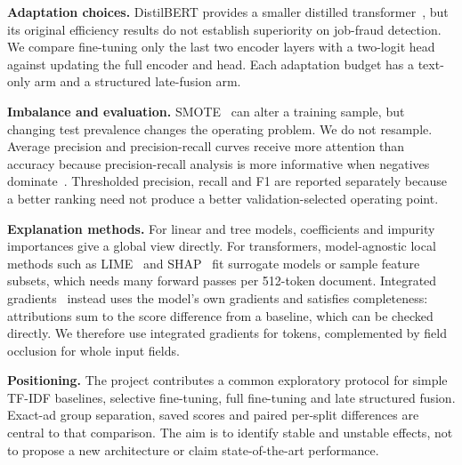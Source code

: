 \textbf{Adaptation choices.} DistilBERT provides a smaller distilled transformer~\cite{sanh2019},
but its original efficiency results do not establish superiority on job-fraud detection. We compare
fine-tuning only the last two encoder layers with a two-logit head against updating the full encoder
and head. Each adaptation budget has a text-only arm and a structured late-fusion arm.

\textbf{Imbalance and evaluation.} SMOTE~\cite{chawla2002} can alter a training sample, but changing
test prevalence changes the operating problem. We do not resample. Average precision and
precision-recall curves receive more attention than accuracy because precision-recall analysis is
more informative when negatives dominate~\cite{saito2015}. Thresholded precision, recall and F1 are
reported separately because a better ranking need not produce a better validation-selected
operating point.

\textbf{Explanation methods.} For linear and tree models, coefficients and impurity importances
give a global view directly. For transformers, model-agnostic local methods such as
LIME~\cite{ribeiro2016} and SHAP~\cite{lundberg2017} fit surrogate models or sample feature subsets,
which needs many forward passes per 512-token document. Integrated gradients~\cite{sundararajan2017}
instead uses the model's own gradients and satisfies completeness: attributions sum to the score
difference from a baseline, which can be checked directly. We therefore use integrated gradients
for tokens, complemented by field occlusion for whole input fields.

\textbf{Positioning.} The project contributes a common exploratory protocol for simple TF-IDF
baselines, selective fine-tuning, full fine-tuning and late structured fusion. Exact-ad group
separation, saved scores and paired per-split differences are central to that comparison. The aim is
to identify stable and unstable effects, not to propose a new architecture or claim state-of-the-art
performance.
